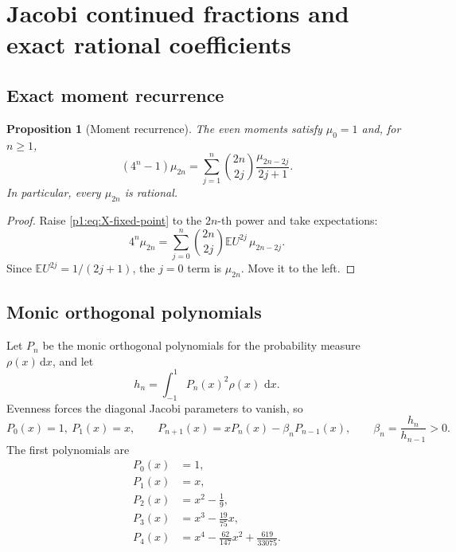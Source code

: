 \documentclass[11pt]{article}
\newtheorem{proposition}[theorem]{Proposition}
\theoremstyle{definition}
\theoremstyle{remark}
\newcommand{\E}{\mathbb E}
\newcommand{\dd}{\,\mathrm d}
\begin{document}
\section{Jacobi continued fractions and exact rational coefficients}\label{p1:sec:jacobi}

\subsection{Exact moment recurrence}

\begin{proposition}[Moment recurrence]\label{p1:prop:moment-recurrence}
The even moments satisfy \(\mu_0=1\) and, for \(n\ge1\),
\begin{equation}
 \boxed{
 (4^n-1)\mu_{2n}
 =\sum_{j=1}^{n}\binom{2n}{2j}\frac{\mu_{2n-2j}}{2j+1}.
 }                                                           \label{p1:eq:moment-recurrence}
\end{equation}
In particular, every \(\mu_{2n}\) is rational.
\end{proposition}

\begin{proof}
Raise \eqref{p1:eq:X-fixed-point} to the \(2n\)-th power and take expectations:
\[
 4^n\mu_{2n}
 =\sum_{j=0}^{n}\binom{2n}{2j}\E U^{2j}\,\mu_{2n-2j}.
\]
Since \(\E U^{2j}=1/(2j+1)\), the \(j=0\) term is \(\mu_{2n}\).  Move it to the left.
\end{proof}

\subsection{Monic orthogonal polynomials}

Let \(P_n\) be the monic orthogonal polynomials for the probability measure
\(\rho(x)\dd x\), and let
\begin{equation}
 h_n=\int_{-1}^{1}P_n(x)^2\rho(x)\,\dd x.                    \label{p1:eq:hn}
\end{equation}
Evenness forces the diagonal Jacobi parameters to vanish, so
\begin{equation}
 P_0(x)=1,\
 P_1(x)=x,
 \qquad
 P_{n+1}(x)=xP_n(x)-\beta_nP_{n-1}(x),
 \qquad
 \beta_n=\frac{h_n}{h_{n-1}}>0.                              \label{p1:eq:monic-recurrence}
\end{equation}
The first polynomials are
\begin{align}
 P_0(x)&=1,\\
 P_1(x)&=x,\\
 P_2(x)&=x^2-\frac19,\\
 P_3(x)&=x^3-\frac{19}{75}x,\\
 P_4(x)&=x^4-\frac{62}{147}x^2+\frac{619}{33075}.
\end{align}
\end{document}
